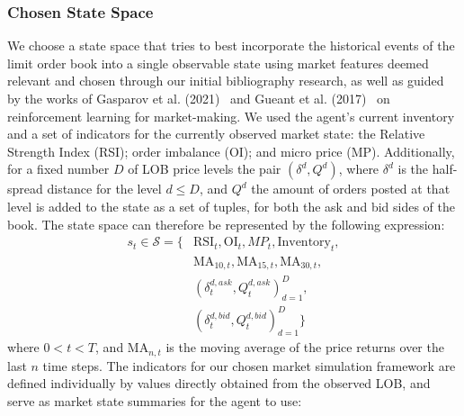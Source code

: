 \subsubsection{Chosen State Space}
We choose a state space that tries to best incorporate the historical events of the limit order book into a single observable state using
market features deemed relevant and chosen through our initial bibliography research,
as well as guided by the works of
Gasparov et al. (2021)~\cite{Gasperov2021} and Gueant et al. (2017)~\cite{Gueant2017} on reinforcement learning for market-making.
We used the agent's current inventory and a set of indicators for the currently observed market state:
the Relative Strength Index (RSI); order imbalance (OI); and micro price (MP).
Additionally, for a fixed number $D$ of LOB price levels the pair $(\delta^d, Q^d)$, where $\delta^d$ is the half-spread distance for the level $d \leq D$,
and $Q^d$ the amount of orders posted at that level is added to the state as a set of tuples, for both the ask and bid sides of the book.
The state space can therefore be represented by the following expression:
\begin{equation*}
    \begin{aligned}
        s_{t} \in \mathcal{S} = \big\{ &\text{RSI}_t, \text{OI}_t, MP_{t}, \text{Inventory}_t, \\
        & \text{MA}_{10, t}, \text{MA}_{15, t}, \text{MA}_{30, t}, \\
        & (\delta_t^{d, ask}, Q_t^{d, ask})_{d=1}^{D}, \\
        & (\delta_t^{d, bid}, Q_t^{d, bid})_{d=1}^{D} \big\}
    \end{aligned}\label{eq:equation}
\end{equation*}
where $0 < t < T$, and $\text{MA}_{n, t}$ is the moving average of the price returns over the last $n$ time steps.
The indicators for our chosen market simulation framework are defined individually by values directly obtained from the observed LOB,
and serve as market state summaries for the agent to use:


